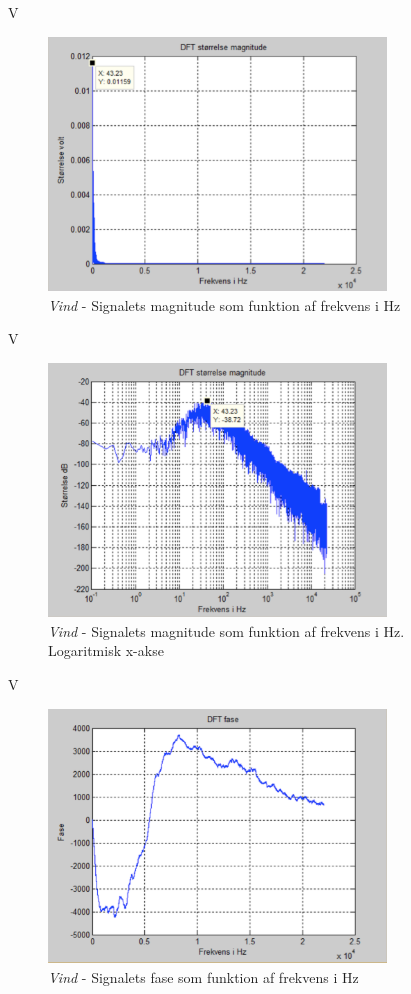 V

\begin{figure}[H]
	\centering
	\includegraphics[width=0.8\textwidth]{Figurer/Vind2}
	\caption{\textit{Vind} - Signalets magnitude som funktion af frekvens i Hz}
\end{figure}

V

\begin{figure}[H]
	\centering
	\includegraphics[width=0.8\textwidth]{Figurer/Vind3}
	\caption{\textit{Vind} - Signalets magnitude som funktion af frekvens i Hz. Logaritmisk x-akse}
\end{figure}

V

\begin{figure}[H]
	\centering
	\includegraphics[width=0.8\textwidth]{Figurer/Vind4}
	\caption{\textit{Vind} - Signalets fase som funktion af frekvens i Hz}
\end{figure}

